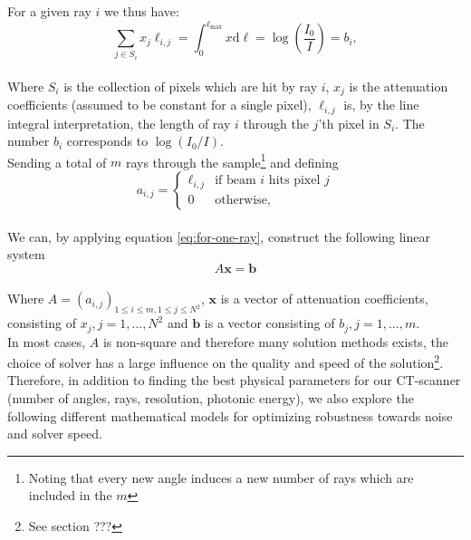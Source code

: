 \documentclass{article}
\begin{document}
For a given ray $i$ we thus have: \\
\begin{equation}\label{eq:for-one-ray}
    \sum_{j \in S_i} x_j \ell_{i, j} = \int_{0}^{\ell_{\max}}x \text{d} \ell = \log\left(\frac{I_0}{I}\right) = b_i,
\end{equation} \\
Where $S_i$ is the collection of pixels which are hit by ray $i$, $x_j$ is the attenuation coefficients (assumed to be constant for a single pixel), $\ell_{i, j}$ is, by the line integral interpretation, the length of ray $i$ through the $j$'th pixel in $S_i$. The number $b_i$ corresponds to $\log{(I_0 / I)}$. \\
Sending a total of $m$ rays through the sample\footnote{Noting that every new angle induces a new number of rays which are included in the $m$}  and defining \\
\begin{equation}
    a_{i, j} = 
    \begin{cases}
        \ell_{i, j} & \text{if beam $i$ hits pixel $j$} \\
        0 & \text{otherwise,}
    \end{cases}
\end{equation} \\
We can, by applying equation \ref{eq:for-one-ray}, construct the following linear system
\begin{equation}
    A \boldsymbol{x} = \boldsymbol{b} \label{eq:main}
\end{equation} \\
Where $A = (a_{i,j})_{1 \leq i \leq m, 1 \leq j \leq N^2}$, $\boldsymbol{x}$ is a vector of attenuation coefficients, consisting of $x_j, j = 1, \dots, N^2$ and $\boldsymbol{b}$ is a vector consisting of $b_j, j = 1, \dots, m$. \\
In most cases, $A$ is non-square and therefore many solution methods exists, the choice of solver has a large influence on the quality and speed of the solution\footnote{See section ???}. Therefore, in addition to finding the best physical parameters for our CT-scanner (number of angles, rays, resolution, photonic energy), we also explore the following different mathematical models for optimizing robustness towards noise and solver speed.
\end{document}
